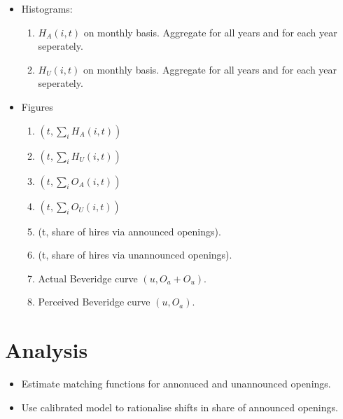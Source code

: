 \documentclass{article}
\begin{document}
\begin{itemize}
\item Histograms:
\begin{enumerate}
\item $H_A(i,t)$ on monthly basis. Aggregate for all years and for each year seperately.
\item $H_U(i,t)$ on monthly basis. Aggregate for all years and for each year seperately.
\end{enumerate}
\item Figures
\begin{enumerate}
\item $(t, \sum_i H_A(i,t)) $
\item $(t, \sum_i H_U(i,t)) $
\item $(t, \sum_i O_A(i,t)) $
\item $(t, \sum_i O_U(i,t)) $
\item (t, share of hires via announced openings).
\item (t, share of hires via unannounced openings).
\item Actual Beveridge curve $(u, O_a+O_u)$.
\item Perceived Beveridge curve $(u, O_a)$.
\end{enumerate}
\end{itemize}

\section{Analysis}

\begin{itemize}
\item Estimate matching functions for annonuced and unannounced openings.
\item Use calibrated model to rationalise shifts in share of announced openings. 
\end{itemize}
\end{document}
